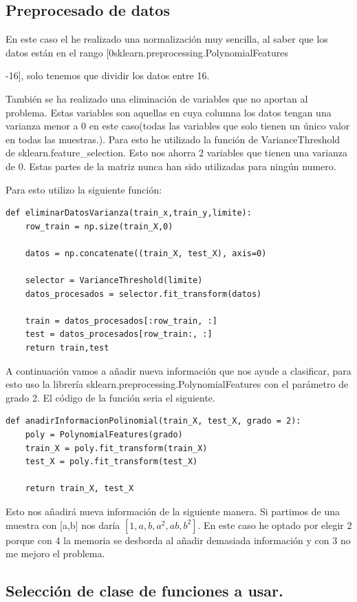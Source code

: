 \documentclass[titlepage]{article}
\begin{document}
	\subsection{Preprocesado de datos}
	En este caso el he realizado una normalización muy sencilla, al saber que los datos están en el rango [0sklearn.preprocessing.PolynomialFeatures
	
	-16], solo tenemos que dividir los datos entre 16.
	
	También se ha realizado una eliminación de variables que no aportan al problema. Estas variables son aquellas en cuya columna los datos tengan una varianza menor a 0 en este caso(todas las variables que solo tienen un único valor en todas las muestras.). Para esto he utilizado la función de VarianceThreshold de sklearn.feature\_selection.
	Esto nos ahorra 2 variables que tienen una varianza de 0. Estas partes de la matriz nunca han sido utilizadas para ningún numero.
	
	Para esto utilizo la siguiente función:
	\begin{lstlisting}
def eliminarDatosVarianza(train_x,train_y,limite):
	row_train = np.size(train_X,0)
	
	datos = np.concatenate((train_X, test_X), axis=0)
	
	selector = VarianceThreshold(limite)
	datos_procesados = selector.fit_transform(datos)
	
	train = datos_procesados[:row_train, :]
	test = datos_procesados[row_train:, :]
	return train,test
	\end{lstlisting}
	
A continuación vamos a añadir nueva información que nos ayude a clasificar, para esto uso la librería sklearn.preprocessing.PolynomialFeatures con el parámetro de grado 2. El código de la función seria el siguiente.
\begin{lstlisting}
def anadirInformacionPolinomial(train_X, test_X, grado = 2):
	poly = PolynomialFeatures(grado)
	train_X = poly.fit_transform(train_X)
	test_X = poly.fit_transform(test_X)
	
	return train_X, test_X
\end{lstlisting}

Esto nos añadirá nueva información de la siguiente manera. Si partimos de una muestra con [a,b] nos daría $[1,a,b,a^2,ab,b^2]$. En este caso he optado por elegir 2 porque con 4 la memoria se desborda al añadir demasiada información y con 3 no me mejoro el problema.

\subsection{Selección de clase de funciones a usar.}
\end{document}
